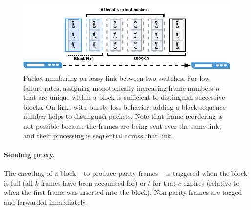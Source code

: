 \begin{figure}
  \centering
  \includegraphics[width=0.35\paperwidth]{figures/example-loss.pdf}
  \caption{\label{fig:example-loss}Packet numbering on lossy link between two switches.  For low failure
  rates, assigning monotonically increasing frame numbers $n$ that are unique within a
  block is sufficient to distinguish successive blocks.  
  On links with bursty loss behavior, adding
  a block sequence number helps to distinguish packets.
  Note that frame
  reordering is not possible because the frames are being sent over the same link,
  and their processing is sequential across that link.}
\end{figure}

\paragraph{Sending proxy.}
The encoding of a block -- to produce parity frames -- is
triggered when the block is full (all $k$ frames have been accounted for) or
$t$ for that $c$ expires (relative to when the first frame was inserted into
the block). Non-parity frames are tagged and forwarded immediately.

